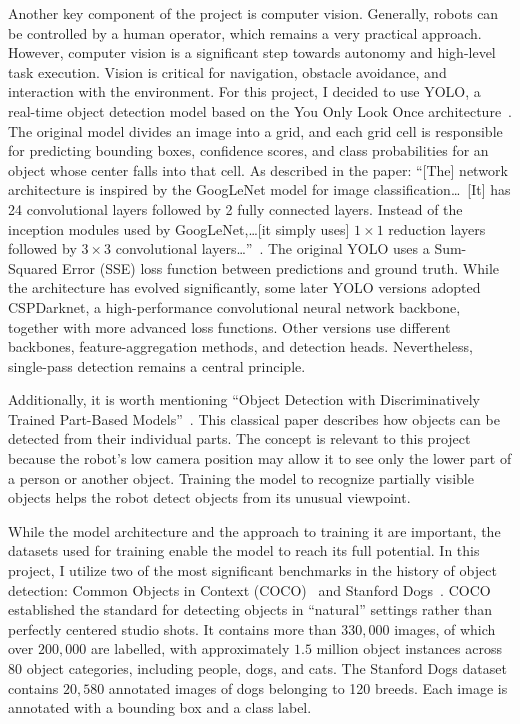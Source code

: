 \documentclass[a4paper,12pt]{report}
\begin{document}
Another key component of the project is computer vision. Generally, robots can be controlled by a
human operator, which remains a very practical approach. However, computer vision is a significant
step towards autonomy and high-level task execution. Vision is critical for navigation, obstacle
avoidance, and interaction with the environment. For this project, I decided to use YOLO,
a real-time object detection model based on the You Only Look Once
architecture~\parencite{yolo}. The original model divides an image into a grid, and each grid cell
is responsible for predicting bounding boxes, confidence scores, and class probabilities for an
object whose center falls into that cell. As described in the paper:
``[The] network architecture is inspired by the GoogLeNet model for image classification\ldots\ [It]
has 24 convolutional layers followed by 2 fully connected layers. Instead of the inception modules
used by GoogLeNet,\ldots [it simply uses] $1 \times 1$ reduction layers followed by $3 \times 3$
convolutional layers\ldots''~\parencite[780]{yolo}. The original YOLO uses a Sum-Squared Error (SSE)
loss function between predictions and ground truth. While the architecture has evolved
significantly, some later YOLO versions adopted CSPDarknet, a high-performance convolutional neural
network backbone, together with more advanced loss functions. Other versions use different
backbones, feature-aggregation methods, and detection heads. Nevertheless, single-pass detection
remains a central principle.

Additionally, it is worth mentioning ``Object Detection with Discriminatively Trained Part-Based
Models''~\parencite{felzenszwalb2010}. This classical paper describes how objects can be detected
from their individual parts. The concept is relevant to this project because the robot's low camera
position may allow it to see only the lower part of a person or another object. Training the model
to recognize partially visible objects helps the robot detect objects from its unusual viewpoint.

While the model architecture and the approach to training it are important, the datasets used for
training enable the model to reach its full potential. In this project, I utilize two of the most
significant benchmarks in the history of object detection: Common Objects in Context
(COCO)~\parencite{coco} and Stanford Dogs~\parencite{stanforddogs}. COCO established the standard
for detecting objects in ``natural'' settings rather than perfectly centered studio shots. It
contains more than $330,000$ images, of which over $200,000$ are labelled, with approximately $1.5$
million object instances across 80 object categories, including people, dogs, and cats. The Stanford
Dogs dataset contains $20,580$ annotated images of dogs belonging to 120 breeds. Each image is
annotated with a bounding box and a class label.
\end{document}

